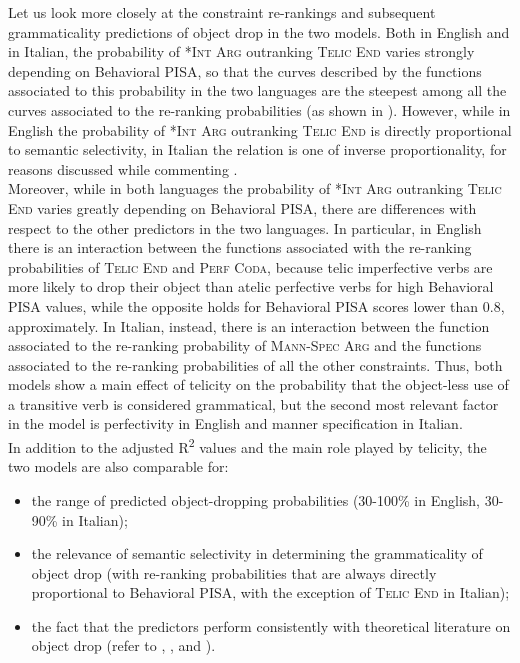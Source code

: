 Let us look more closely at the constraint re-rankings and subsequent grammaticality predictions of object drop in the two models. Both in English and in Italian, the probability of \textsc{*Int Arg} outranking \textsc{Telic End} varies strongly depending on Behavioral PISA, so that the curves described by the functions associated to this probability in the two languages are the steepest among all the curves associated to the re-ranking probabilities (as shown in ). However, while in English the probability of \textsc{*Int Arg} outranking \textsc{Telic End} is directly proportional to semantic selectivity, in Italian the relation is one of inverse proportionality, for reasons discussed while commenting .\\
Moreover, while in both languages the probability of \textsc{*Int Arg} outranking \textsc{Telic End} varies greatly depending on Behavioral PISA, there are differences with respect to the other predictors in the two languages. In particular, in English there is an interaction between the functions associated with the re-ranking probabilities of \textsc{Telic End} and \textsc{Perf Coda}, because telic imperfective verbs are more likely to drop their object than atelic perfective verbs for high Behavioral PISA values, while the opposite holds for Behavioral PISA scores lower than 0.8, approximately. In Italian, instead, there is an interaction between the function associated to the re-ranking probability of \textsc{Mann-Spec Arg} and the functions associated to the re-ranking probabilities of all the other constraints. Thus, both models show a main effect of telicity on the probability that the object-less use of a transitive verb is considered grammatical, but the second most relevant factor in the model is perfectivity in English and manner specification in Italian.\\
In addition to the adjusted R\textsuperscript{2} values and the main role played by telicity, the two models are also comparable for:
\begin{itemize}
    \item the range of predicted object-dropping probabilities (30-100\% in English, 30-90\% in Italian);
    \item the relevance of semantic selectivity in determining the grammaticality of object drop (with re-ranking probabilities that are always directly proportional to Behavioral PISA, with the exception of \textsc{Telic End} in Italian);
    \item the fact that the predictors perform consistently with theoretical literature on object drop (refer to , , and ).
\end{itemize}

